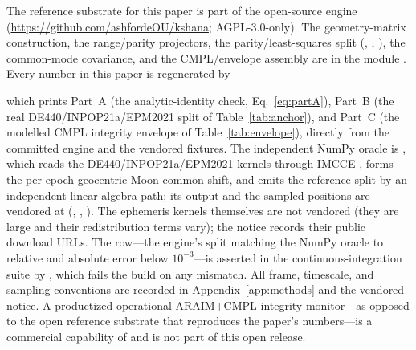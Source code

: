 \label{sec:availability}
The reference substrate for this paper is part of the open-source  engine
\citep{baweja2026kshana} (\url{https://github.com/ashfordeOU/kshana}; AGPL-3.0-only). The
geometry-matrix construction, the range/parity projectors, the parity/least-squares
split (, , ), the
common-mode covariance, and the CMPL/envelope assembly are in the module
. Every number in this paper is regenerated by
\begin{quote}
\end{quote}
which prints Part~A (the analytic-identity check, Eq.~\ref{eq:partA}), Part~B (the real
DE440/INPOP21a/EPM2021 split of Table~\ref{tab:anchor}), and Part~C (the modelled CMPL
integrity envelope of Table~\ref{tab:envelope}), directly from the committed engine and
the vendored fixtures. The independent NumPy oracle is
, which reads the DE440/INPOP21a/EPM2021 kernels
through IMCCE , forms the per-epoch geocentric-Moon common shift, and
emits the reference split by an independent linear-algebra path; its output and the
sampled positions are vendored at 
(, , ). The ephemeris kernels
themselves are not vendored (they are large and their redistribution terms vary); the
notice records their public download URLs. The \Validated{} row---the engine's split
matching the NumPy oracle to relative and absolute error below $10^{-3}$---is asserted in
the continuous-integration suite by
, which fails the build on any
mismatch. All frame, timescale, and sampling conventions are recorded in
Appendix~\ref{app:methods} and the vendored notice. A productized operational
ARAIM$+$CMPL integrity monitor---as opposed to the open reference substrate that
reproduces the paper's numbers---is a commercial capability of  and is
not part of this open release.
